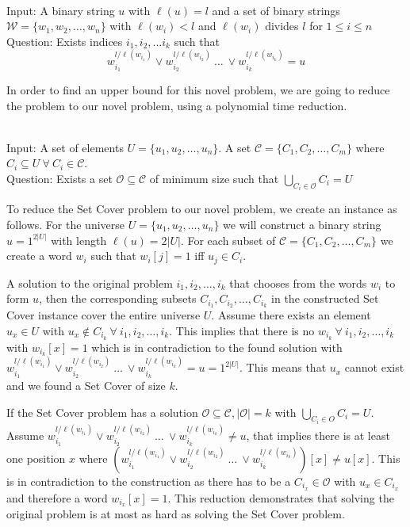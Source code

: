 \begin{defn}{\ \\}
	Input: A binary string $u$ with $\ell(u)= l$ and a set of binary strings $\mathcal{W}=\{w_1, w_2, \dots, w_n\}$ with $\ell(w_i) < l$ and $\ell(w_i)$ divides $l$ for $1 \leq i \leq n$\\
	Question: Exists indices $i_1, i_2, \dots i_k$ such that
	$$w_{i_1}^{l / \ell(w_{i_1})} \lor w_{i_2}^{l / \ell(w_{i_2})} ~\dots~ \lor w_{i_k}^{l / \ell(w_{i_k})} = u $$
\end{defn}

In order to find an upper bound for this novel problem, we are going to reduce the {} problem to our novel {} problem, using a polynomial time reduction.

\begin{defn}{\ \\}
	Input: A set of elements $U = \{u_1, u_2, \dots , u_n\}$. A set $\mathcal{C} = \{C_1, C_2, \dots , C_m\}$ where $C_i \subseteq U ~\forall~ C_i \in \mathcal{C}$.\\
	Question: Exists a set $\mathcal{O} \subseteq \mathcal{C}$ of minimum size such that $\underset{C_i \in \mathcal{O}}{\bigcup}C_i = U$
\end{defn}

To reduce the Set Cover problem to our novel problem, we create an instance as follows. For the universe $U = \{u_1, u_2, \dots, u_n\}$ we will construct a binary string $u= 1^{2|U|}$ with length $\ell(u) = 2|U|$. For each subset of $\mathcal{C} = \{C_1, C_2, \dots, C_m\}$ we create a word $w_i$ such that $w_i[j] = 1$ iff $u_j \in C_i$. 

A solution to the original problem $i_1, i_2, \dots, i_k$ that chooses from the words $w_i$ to form $u$, then the corresponding subsets $C_{i_1}, C_{i_2}, \dots, C_{i_k}$ in the constructed Set Cover instance cover the entire universe $U$. Assume there exists an element $u_x \in U$ with $u_x \not \in C_{i_k} ~\forall~ i_1, i_2, \dots, i_k$. This implies that there is no $w_{i_k} ~\forall~ i_1, i_2, \dots, i_k$ with $w_{i_k}[x]=1$ which is in contradiction to the found solution with $w_{i_1}^{l / \ell(w_{i_1})} \lor w_{i_2}^{l / \ell(w_{i_2})} ~\dots~ \lor w_{i_k}^{l / \ell(w_{i_k})} = u = 1^{2|U|}$. This means that $u_x$ cannot exist and we found a Set Cover of size $k$.

If the Set Cover problem has a solution $\mathcal{O} \subseteq \mathcal{C}, |\mathcal{O}|=k$ with $\bigcup_{C_i \in O} C_i = U$. Assume $w_{i_1}^{l / \ell(w_{i_1})} \lor w_{i_2}^{l / \ell(w_{i_2})} ~\dots~ \lor w_{i_k}^{l / \ell(w_{i_k})} \not = u$, that implies there is at least one position $x$ where $(w_{i_1}^{l / \ell(w_{i_1})} \lor w_{i_2}^{l / \ell(w_{i_2})} ~\dots~ \lor w_{i_k}^{l / \ell(w_{i_k})})[x] \not= u[x] $. This is in contradiction to the construction as there has to be a $C_{i_x} \in \mathcal{O}$ with $u_x \in C_{i_x}$ and therefore a word $w_{i_x}[x]=1$. This reduction demonstrates that solving the original problem is at most as hard as solving the Set Cover problem.


